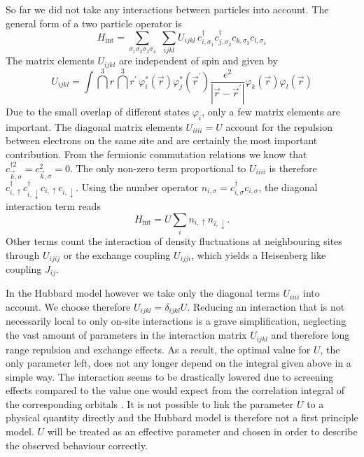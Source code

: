 So far we did not take any interactions between particles into account.
The general form of a two particle operator is
\begin{equation}
 H_{\text{int}} = \sum_{\sigma_1 \sigma_2 \sigma_3 \sigma_4} \; \sum_{ijkl} U_{ijkl} \, c^{\dagger}_{i,\sigma_1} c^{\dagger}_{j,\sigma_2} c_{k,\sigma_3} c_{l,\sigma_4}
\end{equation}
%
The matrix elements $U_{ijkl}$ are independent of spin and given by
\begin{equation}
 U_{ijkl} = \int \!  \dint^3 r  \, \dint^3 r^{\prime} \,  \varphi_i^*(\vec{r}) \varphi_j^*(\vec{r}^{\prime}) \frac{e^2}{|\vec{r}-\vec{r}^{\prime} |} \varphi_k(\vec{r}) \varphi_l(\vec{r}) 
\end{equation}
Due to the small overlap of different states $\varphi_i$, only a few matrix elements are important.
The diagonal matrix elements $U_{iiii} = U$ account for the repulsion between electrons on the same site and are certainly the most important contribution.
%
From the fermionic commutation relations we know that $c^{\dagger 2}_{\vec k,\sigma}=c_{\vec k,\sigma}^2=0$.
The only non-zero term proportional to $U_{iiii}$ is therefore $c^{\dagger}_{i,\uparrow} c^{\dagger}_{i,\downarrow} c_{i,\uparrow} c_{i,\downarrow}$. 
Using the number operator $n_{i,\sigma} = c^{\dagger}_{i,\sigma} c_{i,\sigma}$, the diagonal interaction term reads
\begin{equation}
 H_{\text{int}} = U \sum_i n_{i,\uparrow} n_{i,\downarrow}.
\end{equation}
Other terms count the interaction of density fluctuations at neighbouring sites through $U_{ijij}$ 
or
the exchange coupling $U_{ijji}$, which yields a Heisenberg like coupling $J_{ij}$.

In the Hubbard model however we take only the diagonal terms $U_{iiii}$ into account.
We choose therefore $U_{ijkl} = \delta_{ijkl} U$. 
Reducing an interaction that is not necessarily local to only on-site interactions is a grave simplification, 
neglecting the vast amount of parameters in the interaction matrix $U_{ijkl}$ and therefore long range repulsion and exchange effects.
As a result, the optimal value for $U$, the only parameter left, does not any longer depend on the integral given above in a simple way.
The interaction seems to be drastically lowered due to screening effects compared to the value one would expect from the correlation integral of the corresponding orbitals
\cite{J.Phys.Cond.Matter.Vol21.34}.
It is not possible to link the parameter $U$ to a physical quantity directly
and the Hubbard model is therefore not a first principle model. 
$U$ will be treated as an effective parameter and chosen in order to describe the observed behaviour correctly. 



